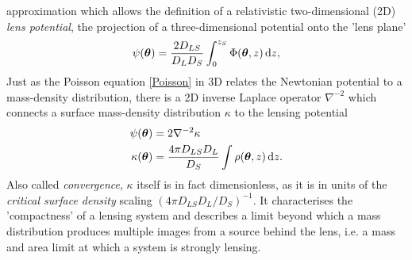 approximation which allows the definition of a relativistic two-dimensional (2D)
\textit{lens potential}, the projection of a three-dimensional potential onto
the 'lens plane'
%
%
\begin{equation}\eqlbl{lens_potential}%
  \psi(\bm\theta) = \frac{2D_{LS}}{D_{L}D_{S}}\int_{0}^{z_{S}}\Phi(\bm\theta, z)\,\mathrm{d}z,
\end{equation}%
%
Just as the Poisson equation \eqref*{Poisson} in 3D relates the Newtonian
potential to a mass-density distribution, there is a 2D inverse Laplace
operator $\nabla^{-2}$
which connects a surface mass-density distribution $\kappa$ to the lensing
potential
%
%
\begin{equation}\eqlbl{convergence}%
  \begin{aligned}
    \psi(\bm\theta) &= 2\nabla^{-2}\kappa \\
    \kappa(\bm\theta) &= \frac{4\pi D_{LS}D_{L}}{D_{S}}
    \int \rho(\bm\theta, z)\,\mathrm{d}z.
  \end{aligned}
\end{equation}%
%
Also called \textit{convergence}, $\kappa$ itself is in fact dimensionless, as
it is in units of the \textit{critical surface density} scaling $\left(4\pi
D_{LS}D_{L}/D_{S}\right)^{-1}$.  It characterises the 'compactness' of a lensing
system and describes a limit beyond which a mass distribution produces multiple
images from a source behind the lens, i.e. a mass and area limit at which a
system is strongly lensing.

